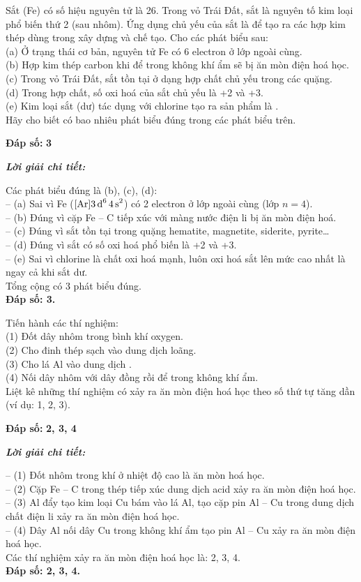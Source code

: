 \documentclass[11pt,a4paper]{article}
\def\loigiai#1{
\par\begingroup\color{blue!80!black}\small
\noindent\textbf{\textit{Lời giải chi tiết:}}\par
#1\par\endgroup}
\begin{document}
\begin{ex}
Sắt (Fe) có số hiệu nguyên tử là 26. Trong vỏ Trái Đất, sắt là nguyên tố kim loại phổ biến thứ 2 (sau nhôm). Ứng dụng chủ yếu của sắt là để tạo ra các hợp kim thép dùng trong xây dựng và chế tạo. Cho các phát biểu sau:\\
(a) Ở trạng thái cơ bản, nguyên tử Fe có 6 electron ở lớp ngoài cùng.\\
(b) Hợp kim thép carbon khi để trong không khí ẩm sẽ bị ăn mòn điện hoá học.\\
(c) Trong vỏ Trái Đất, sắt tồn tại ở dạng hợp chất chủ yếu trong các quặng.\\
(d) Trong hợp chất, số oxi hoá của sắt chủ yếu là +2 và +3.\\
(e) Kim loại sắt (dư) tác dụng với chlorine tạo ra sản phẩm là .\\
Hãy cho biết có bao nhiêu phát biểu đúng trong các phát biểu trên.
\par\noindent\textbf{Đáp số:} \textbf{\color{red}3}
\loigiai{
Các phát biểu đúng là (b), (c), (d):\\
-- (a) Sai vì Fe ($[\ce{Ar}] \ce{3d^6 4s^2}$) có 2 electron ở lớp ngoài cùng (lớp $n = 4$).\\
-- (b) Đúng vì cặp Fe -- C tiếp xúc với màng nước điện li bị ăn mòn điện hoá.\\
-- (c) Đúng vì sắt tồn tại trong quặng hematite, magnetite, siderite, pyrite\dots\\
-- (d) Đúng vì sắt có số oxi hoá phổ biến là +2 và +3.\\
-- (e) Sai vì chlorine là chất oxi hoá mạnh, luôn oxi hoá sắt lên mức cao nhất là \ce{FeCl3} ngay cả khi sắt dư.\\
Tổng cộng có 3 phát biểu đúng.\\
\textbf{Đáp số: 3.}}
\end{ex}

\begin{ex}
Tiến hành các thí nghiệm:\\
(1) Đốt dây nhôm trong bình khí oxygen.\\
(2) Cho đinh thép sạch vào dung dịch  loãng.\\
(3) Cho lá Al vào dung dịch .\\
(4) Nối dây nhôm với dây đồng rồi để trong không khí ẩm.\\
Liệt kê những thí nghiệm có xảy ra ăn mòn điện hoá học theo số thứ tự tăng dần (ví dụ: 1, 2, 3).
\par\noindent\textbf{Đáp số:} \textbf{\color{red}2, 3, 4}
\loigiai{
-- (1) Đốt nhôm trong khí  ở nhiệt độ cao là ăn mòn hoá học.\\
-- (2) Cặp Fe -- C trong thép tiếp xúc dung dịch acid \ce{H2SO4} xảy ra ăn mòn điện hoá học.\\
-- (3) Al đẩy \ce{Cu^2+} tạo kim loại Cu bám vào lá Al, tạo cặp pin Al -- Cu trong dung dịch chất điện li xảy ra ăn mòn điện hoá học.\\
-- (4) Dây Al nối dây Cu trong không khí ẩm tạo pin Al -- Cu xảy ra ăn mòn điện hoá học.\\
Các thí nghiệm xảy ra ăn mòn điện hoá học là: 2, 3, 4.\\
\textbf{Đáp số: 2, 3, 4.}}
\end{ex}
\end{document}
